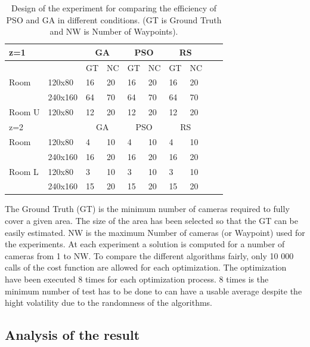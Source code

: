 \begin{table} [!htb]
\begin{tabular}{|l|l|l|l|l|l|l|l|l|l|}
  \hline
  \multicolumn{2}{|l|}{z=1 } &\multicolumn{2}{|c|}{GA}  & \multicolumn{2}{|c|}{PSO} & \multicolumn{2}{|c|}{RS}  \\  \hline
  \multicolumn{2}{|c|}{ } & GT & NC & GT & NC & GT & NC\\ \hline
  Room &  120x80 & 16 &20 & 16 & 20 & 16 & 20\\ \cline{2-8}
     &  240x160 & 64 &70 & 64 & 70 & 64 & 70 \\ \hline
  Room U &  120x80 & 12 &20 & 12 & 20 & 12 & 20\\ \hline
  \multicolumn{2}{|l|}{z=2 } &\multicolumn{2}{|c|}{GA}  & \multicolumn{2}{|c|}{PSO}& \multicolumn{2}{|c|}{RS}  \\  \hline
 Room &  120x80 & 4 &10 & 4 & 10 & 4 & 10\\ \cline{2-8}
     &  240x160 & 16 &20 & 16 & 20 & 16 & 20 \\ \hline
 Room L&  120x80 & 3 &10 & 3 & 10 & 3 & 10\\ \cline{2-8}
     &  240x160 & 15 &20 & 15 & 20 & 15 & 20 \\ \hline
  
\end{tabular}
\caption{Design of the experiment for comparing the efficiency of PSO and GA in different conditions.  (GT is Ground Truth and NW is Number of Waypoints).}\label{table:table1}

\end{table}

The Ground Truth (GT) is the minimum number of cameras required to fully cover a given area. The size of the area has been selected so that the GT can be easily estimated. 
NW is the maximum Number of cameras (or Waypoint) used for the experiments.  
At each experiment a solution is computed for a number of cameras from 1 to NW. To compare the different algorithms fairly, only 10 000 calls of the cost function are allowed for each optimization.
The optimization have been executed 8 times for each optimization process. 8 times is the minimum number of test has to be done to can have a usable average despite the hight volatility due to the randomness of the algorithms.\\ %


\subsection{ Analysis of the result }


